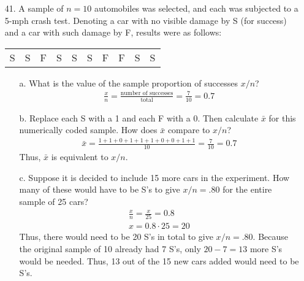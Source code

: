\documentclass[letterpaper,12pt]{article}
\begin{document}
\begin{enumerate}
\begin{enumerate}
    \end{enumerate}
  \item[41.]
    A sample of $n = 10$ automobiles was selected, and each was subjected to a 5-mph crash test. Denoting a car with no visible damage by S (for success) and a car with such damage by F, results were as follows:
    \begin{center}
      \begin{tabular}{cccccccccc}
        S & S & F & S & S & S & F & F & S & S
      \end{tabular}
    \end{center}
    \begin{enumerate}
      \item[a.]
        What is the value of the sample proportion of successes $x/n$?
        \begin{align*}
          \frac{x}{n} = \frac{\text{number of successes}}{\text{total}} = \frac{7}{10} = 0.7
        \end{align*}
      \item[b.]
        Replace each S with a 1 and each F with a 0. Then calculate $\bar{x}$ for this numerically coded sample. How does $\bar{x}$ compare to $x/n$?
        \begin{align*}
          \bar{x} = \frac{1 + 1 + 0 + 1 + 1 + 1 + 0 + 0 + 1 + 1}{10} = \frac{7}{10} = 0.7
        \end{align*}
        Thus, $\bar{x}$ is equivalent to $x/n$.
      \item[c.]
        Suppose it is decided to include 15 more cars in the experiment. How many of these would have to be S's to give $x/n = .80$ for the entire sample of 25 cars?
        \begin{align*}
          \frac{x}{n} = \frac{x}{25} = 0.8 \\
          x = 0.8 \cdot 25 = 20
        \end{align*}
        Thus, there would need to be 20 S's in total to give $x/n = .80$. Because the original sample of 10 already had 7 S's, only $20 - 7 = 13$ more S's would be needed. Thus, 13 out of the 15 new cars added would need to be S's.
    \end{enumerate}
\end{enumerate}
\end{document}
